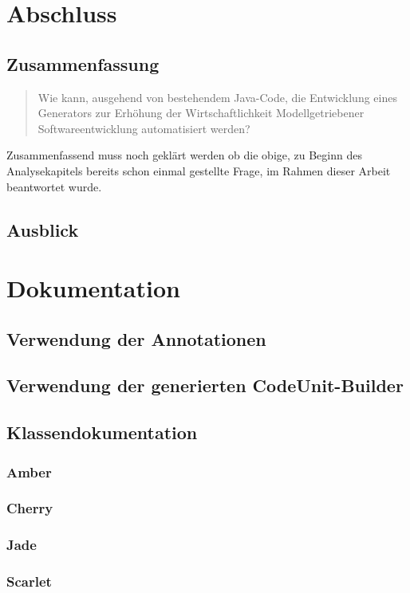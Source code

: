 \documentclass[12pt,oneside,a4paper,parskip]{scrbook}
\begin{document}
\chapter{Abschluss}
\section{Zusammenfassung}
\begin{quote}\glqq Wie kann, ausgehend von bestehendem Java-Code, die Entwicklung eines Generators zur Erhöhung der Wirtschaftlichkeit Modellgetriebener Softwareentwicklung automatisiert werden?\grqq \end{quote}

Zusammenfassend muss noch geklärt werden ob die obige, zu Beginn des Analysekapitels bereits schon einmal gestellte Frage, im Rahmen dieser Arbeit beantwortet wurde.

\section{Ausblick}

\appendix
\chapter{Dokumentation}
\section{Verwendung der Annotationen}
\section{Verwendung der generierten CodeUnit-Builder}
\section{Klassendokumentation}
\subsection{Amber}
\subsection{Cherry}
\subsection{Jade}
\subsection{Scarlet}
\end{document}
